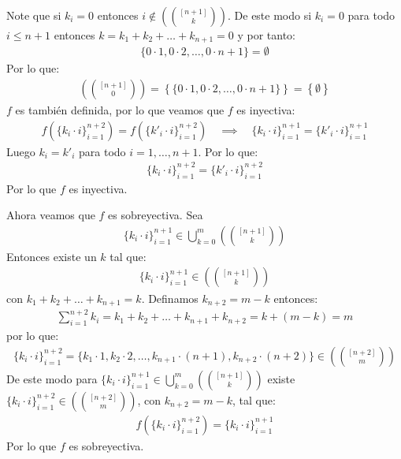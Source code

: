 \begin{solucion}
Note que si $k_i = 0$ entonces $i \notin \left(\binom{[n+1]}{k}\right)$. De este modo si $k_i = 0$ para todo $i \leq n+1$ entonces $k= k_1+k_2+\ldots+k_{n+1} = 0$ y por tanto:
\begin{align*}
    \{0\cdot 1, 0\cdot 2, \ldots, 0\cdot n+1\} = \emptyset
\end{align*}
Por lo que:
\begin{align*}
    \left(\binom{[n+1]}{0}\right) = \left\{
        \{0\cdot 1, 0\cdot 2, \ldots, 0\cdot n+1\}
    \right\}=\left\{
        \emptyset
    \right\}
\end{align*}        
$f$ es también definida, por lo que veamos que $f$ es inyectiva:
\begin{align*}
    f(\{k_i\cdot i\}_{i=1}^{n+2}) = f(\{k'_i\cdot i\}_{i=1}^{n+2})\quad \implies \quad  \{k_i\cdot i\}_{i=1}^{n+1} = \{k'_i\cdot i\}_{i=1}^{n+1}
\end{align*}
Luego $k_i = k'_i$ para todo $i=1,\ldots,n+1$. Por lo que:
\begin{align*}
    \{k_i\cdot i\}_{i=1}^{n+2} = \{k'_i\cdot i\}_{i=1}^{n+2}
\end{align*}
Por lo que $f$ es inyectiva.

Ahora veamos que $f$ es sobreyectiva. Sea 
\begin{align*}
    \{k_i\cdot i\}_{i=1}^{n+1} \in \bigcup_{k=0}^m \left(\binom{[n+1]}{k}\right)
\end{align*}
Entonces existe un $k$ tal que:
\begin{align*}
    \{k_i\cdot i\}_{i=1}^{n+1} \in \left(\binom{[n+1]}{k}\right)
\end{align*}
con $k_1 + k_2 + \ldots + k_{n+1} = k$. Definamos $k_{n+2} = m - k$ entonces:
\begin{align*}
    \sum_{i=1}^{n+2} k_i = k_1 + k_2 + \ldots + k_{n+1} + k_{n+2} = k + (m - k) = m
\end{align*}
por lo que:
\begin{align*}
    \{k_i\cdot i\}_{i=1}^{n+2} = \{k_1\cdot 1, k_2\cdot 2, \ldots, k_{n+1}\cdot (n+1), k_{n+2}\cdot (n+2)\} \in \left(\binom{[n+2]}{m}\right)
\end{align*}
De este modo para $\{k_i\cdot i\}_{i=1}^{n+1} \in \bigcup_{k=0}^m \left(\binom{[n+1]}{k}\right)$ existe $\{
k_i\cdot i\}_{i=1}^{n+2} \in \left(\binom{[n+2]}{m}\right)$, con $k_{n+2} = m - k$, tal que:
\begin{align*}
    f(\{k_i\cdot i\}_{i=1}^{n+2}) = \{k_i\cdot i\}_{i=1}^{n+1}
\end{align*}
Por lo que $f$ es sobreyectiva.


\end{solucion}
